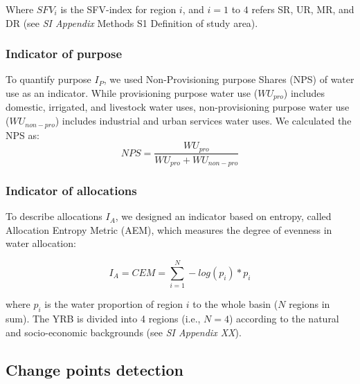 	Where $SFV_i$ is the SFV-index for region $i$, and $i=1$ to $4$ refers SR, UR, MR, and DR (see \textit{SI Appendix} Methods S1 Definition of study area).

	\subsubsection*{Indicator of purpose}
	To quantify purpose $I_P$, we used Non-Provisioning purpose Shares (NPS) of water use as an indicator. While provisioning purpose water use ($WU_{pro}$) includes domestic, irrigated, and livestock water uses, non-provisioning purpose water use ($WU_{non-pro}$) includes industrial and urban services water uses. We calculated the NPS as:
	\begin{equation}
		NPS = \frac{WU_{pro}}{WU_{pro} + WU_{non-pro}}
	\end{equation}

	\subsubsection*{Indicator of allocations}
	To describe allocations $I_A$, we designed an indicator based on entropy, called Allocation Entropy Metric (AEM), which measures the degree of evenness in water allocation:

	\begin{equation}
		I_A = CEM = \sum_{i=1}^N -log(p_{i}) * p_{i}
	\end{equation}

	where $p_{i}$ is the water proportion of region $i$ to the whole basin ($N$ regions in sum). The YRB is divided into 4 regions (i.e., $N = 4$) according to the natural and socio-economic backgrounds (see \textit{SI Appendix XX}).

	\subsection{Change points detection}

